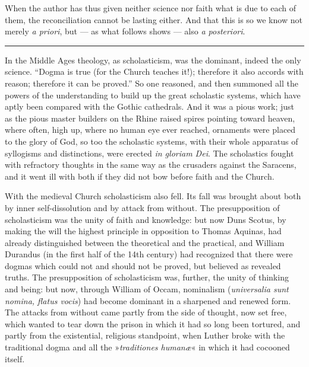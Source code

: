 \documentclass[12pt,a4paper]{book}
\newcommand{\opage}[1]{\marginnote{\footnotesize\textit{[#1]}}}
\begin{document}
When the author has thus given neither science nor
faith what is due to each of them, the reconciliation cannot
be lasting either. And that this is so we know not
merely \textit{a priori}, but --- as what follows shows --- also
\textit{a posteriori}.

\begin{center}\rule{4em}{0.4pt}\end{center}

\opage{12}\setcounter{footnote}{0}%
In the Middle Ages theology, as scholasticism, was the dominant, indeed the only
science. ``Dogma is true (for the Church teaches it!); therefore it also
accords with reason; therefore it can be proved.'' So one reasoned, and then
summoned all the powers of the understanding to build up the great scholastic
systems, which have aptly been compared with the Gothic cathedrals. And it
was a pious work; just as the pious master builders on the Rhine raised spires
pointing toward heaven, where often, high up, where no human eye ever reached,
ornaments were placed to the glory of God, so too the scholastic systems, with
their whole apparatus of syllogisms and distinctions, were erected
\textit{in gloriam Dei}. The scholastics fought with refractory thoughts in the
same way as the crusaders against the Saracens, and it went ill with both if
they did not bow before faith and the Church.

With the medieval Church scholasticism also fell. Its fall was brought about
both by inner self-dissolution and by attack from without. The presupposition
of scholasticism was the unity of faith and knowledge: but now Duns Scotus, by
making the will the highest principle in opposition to Thomas Aquinas, had
already distinguished between the theoretical and the practical, and William
Durandus (in the first half of the 14th century) had recognized that there
were dogmas which could not and should not be proved, but believed as revealed
truths. The presupposition of scholasticism was, further, the unity of
thinking and being:
\opage{13}\setcounter{footnote}{0}%
but now, through William of Occam, nominalism (\textit{universalia sunt nomina,
flatus vocis}) had become dominant in a sharpened and renewed form. The
attacks from without came partly from the side of thought, now set free, which
wanted to tear down the prison in which it had so long been tortured, and
partly from the existential, religious standpoint, when Luther broke with the
traditional dogma and all the »\textit{traditiones humanæ}« in which it had
cocooned itself.
\end{document}
